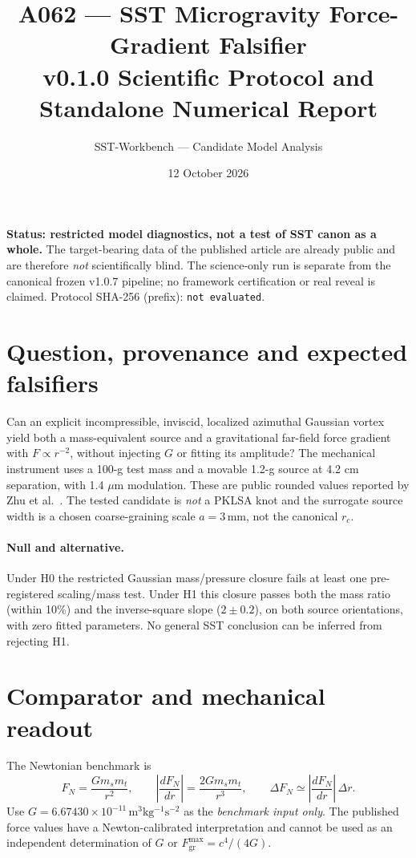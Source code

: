 \documentclass[11pt,a4paper]{article}
\title{A062 --- SST Microgravity Force-Gradient Falsifier\\\large v0.1.0 Scientific Protocol and Standalone Numerical Report}
\author{SST-Workbench --- Candidate Model Analysis}
\date{12 October 2026}
\newcommand{\AHASH}{not evaluated}
\begin{document}
\maketitle
{}
\noindent\textbf{Status: restricted model diagnostics, not a test of SST canon as a whole.}
The target-bearing data of the published article are already public and are therefore \emph{not} scientifically blind. The science-only run is separate from the canonical frozen v1.0.7 pipeline; no framework certification or real reveal is claimed. Protocol SHA-256 (prefix): \texttt{\AHASH}.

\section{Question, provenance and expected falsifiers}
Can an explicit incompressible, inviscid, localized azimuthal Gaussian vortex yield both a mass-equivalent source and a gravitational far-field force gradient with $F\propto r^{-2}$, without injecting $G$ or fitting its amplitude? The mechanical instrument uses a 100-g test mass and a movable 1.2-g source at 4.2 cm separation, with 1.4 $\mu$m modulation. These are public rounded values reported by Zhu et al.\ \cite{Zhu2026}. The tested candidate is \emph{not} a PKLSA knot and the surrogate source width is a chosen coarse-graining scale $a=3\,\mathrm{mm}$, not the canonical $r_c$.

\paragraph{Null and alternative.} Under H0 the restricted Gaussian mass/pressure closure fails at least one pre-registered scaling/mass test. Under H1 this closure passes both the mass ratio (within 10\%) and the inverse-square slope ($2\pm0.2$), on both source orientations, with zero fitted parameters. No general SST conclusion can be inferred from rejecting H1.

\section{Comparator and mechanical readout}
The Newtonian benchmark is
\begin{equation}F_N=\frac{G m_s m_t}{r^2},\qquad
\left|\frac{d F_N}{dr}\right|=\frac{2Gm_sm_t}{r^3},\qquad \Delta F_N\simeq\left|\frac{d F_N}{dr}\right|\,\Delta r.\end{equation}
Use $G=6.67430\times10^{-11}\,\mathrm{m^3 kg^{-1}s^{-2}}$ as the \emph{benchmark input only}. The published force values have a Newton-calibrated interpretation and cannot be used as an independent determination of $G$ or $F_{\mathrm{gr}}^{\max}=c^4/(4G)$.
\end{document}
